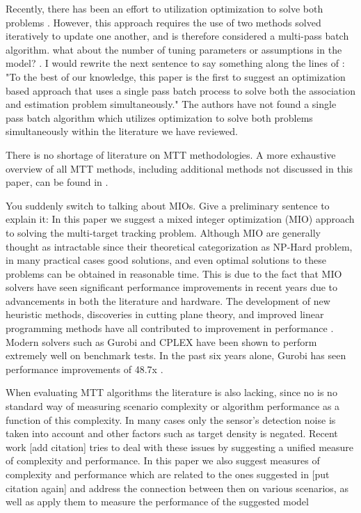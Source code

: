 \documentclass[journal]{IEEEtran}
\begin{document}
Recently, there has been an effort to utilization optimization to solve both problems \cite{Discrete-Continuous}. However, this approach requires the use of two methods solved iteratively to update one another, and is therefore considered a multi-pass batch algorithm.  {\color{red}what about the number of tuning parameters or assumptions in the model? . I would rewrite the next sentence to say something along the lines of : "To the best of our knowledge, this paper is the first to suggest an optimization based approach that uses a single pass batch process to solve both the association and estimation problem simultaneously."} The authors have not found a single pass batch algorithm which utilizes optimization to solve both problems simultaneously within the literature we have reviewed. 

There is no shortage of literature on MTT methodologies. A more exhaustive overview of all MTT methods, including additional methods not discussed in this paper, can be found in \cite{MTT-Taxonomy}.

{\color{red} You suddenly switch to talking about MIOs. Give a preliminary sentence to explain it:
In this paper we suggest a mixed integer optimization (MIO) approach to solving the multi-target tracking problem. Although MIO are generally thought as intractable since their theoretical categorization as NP-Hard problem, in many practical cases good solutions, and even optimal solutions to these problems can be obtained in reasonable time. This is due to the fact that MIO} solvers have seen significant performance improvements in recent years due to advancements in both the literature and hardware. The development of new heuristic methods, discoveries in cutting plane theory, and improved linear programming methods have all contributed to improvement in performance \cite{Gurobi-MIP}. Modern solvers such as Gurobi and CPLEX have been shown to perform extremely well on benchmark tests. In the past six years alone, Gurobi has seen performance improvements of 48.7x \cite{Gurobi-Benchmark}.

{\color{red} When evaluating MTT algorithms the literature is also lacking, since no is no standard way of measuring scenario complexity or algorithm performance as a function of this complexity. In many cases only the sensor's detection noise is taken into account and other factors such as target density is negated. Recent work [add citation] tries to deal with these issues by suggesting a unified measure of complexity and performance. In this paper we also suggest measures of complexity and performance which are related to the ones suggested in [put citation again] and address the connection between then on various scenarios, as well as apply them to measure the performance of the suggested model}
\end{document}
